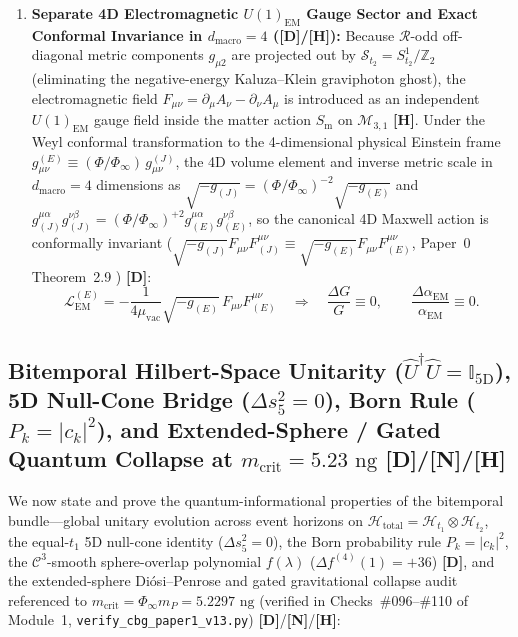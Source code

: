 \documentclass[11pt,a4paper]{article}
\newcommand{\catD}{\textbf{\textcolor{blue!75!black}{[D]}}}
\newcommand{\catH}{\textbf{\textcolor{orange!85!black}{[H]}}}
\newcommand{\catN}{\textbf{\textcolor{teal!75!black}{[N]}}}
\theoremstyle{definition}
\theoremstyle{remark}
\begin{document}
\begin{enumerate}
  \item[\textnormal{(ii)}] \textbf{Separate 4D Electromagnetic $U(1)_{\text{EM}}$ Gauge Sector and Exact Conformal Invariance in $d_{\text{macro}} = 4$ (\catD/\catH):} Because $\mathcal{R}$-odd off-diagonal metric components $g_{\mu 2}$ are projected out by $\mathcal{S}_{t_2} = S^1_{t_2}/\mathbb{Z}_2$ (eliminating the negative-energy Kaluza--Klein graviphoton ghost), the electromagnetic field $F_{\mu\nu} = \partial_{\mu}A_{\nu} - \partial_{\nu}A_{\mu}$ is introduced as an independent $U(1)_{\text{EM}}$ gauge field inside the matter action $S_{\text{m}}$ on $\mathcal{M}_{3,1}$ \catH. Under the Weyl conformal transformation to the 4-dimensional physical Einstein frame $g_{\mu\nu}^{(E)} \equiv (\Phi/\Phi_{\infty})\,g_{\mu\nu}^{(J)}$, the 4D volume element and inverse metric scale in $d_{\text{macro}} = 4$ dimensions as $\sqrt{-g_{(J)}} = (\Phi/\Phi_{\infty})^{-2}\sqrt{-g_{(E)}}$ and $g_{(J)}^{\mu\alpha}g_{(J)}^{\nu\beta} = (\Phi/\Phi_{\infty})^{+2}g_{(E)}^{\mu\alpha}g_{(E)}^{\nu\beta}$, so the canonical 4D Maxwell action is conformally invariant ($\sqrt{-g_{(J)}}F_{\mu\nu}F^{\mu\nu}_{(J)} \equiv \sqrt{-g_{(E)}}F_{\mu\nu}F^{\mu\nu}_{(E)}$, Paper~0 Theorem~2.9 \cite{JV_Paper0}) \catD:
  \begin{equation}
    \mathcal{L}_{\text{EM}}^{(E)} = -\frac{1}{4\mu_{\text{vac}}}\sqrt{-g_{(E)}}\,F_{\mu\nu}F^{\mu\nu}_{(E)} \quad \Longrightarrow \quad \frac{\Delta G}{G} \equiv 0, \qquad \frac{\Delta\alpha_{\text{EM}}}{\alpha_{\text{EM}}} \equiv 0.
    \label{eq:exact_zf_derived}
  \end{equation}
\end{enumerate}

\subsection{\texorpdfstring{Bitemporal Hilbert-Space Unitarity ($\hat{U}^\dagger\hat{U} = \mathbb{I}_{5\text{D}}$), 5D Null-Cone Bridge ($\Delta s_5^2 = 0$), Born Rule ($P_k = |c_k|^2$), and Extended-Sphere / Gated Quantum Collapse at $m_{\text{crit}} = 5.23\text{ ng}$ \catD/\catN/\catH}{Bitemporal Hilbert-Space Unitarity, 5D Null-Cone Bridge, Born Rule, and Extended-Sphere / Gated Quantum Collapse}}

We now state and prove the quantum-informational properties of the bitemporal bundle---global unitary evolution across event horizons on $\mathcal{H}_{\text{total}} = \mathcal{H}_{t_1} \otimes \mathcal{H}_{t_2}$, the equal-$t_1$ 5D null-cone identity ($\Delta s_5^2 = 0$), the Born probability rule $P_k = |c_k|^2$, the $\mathcal{C}^3$-smooth sphere-overlap polynomial $f(\lambda)$ ($\Delta f^{(4)}(1) = +36$) \catD, and the extended-sphere Di\'osi--Penrose and gated gravitational collapse audit referenced to $m_{\text{crit}} = \Phi_{\infty}m_P = 5.2297\text{ ng}$ (verified in Checks~\#096--\#110 of Module~1, \texttt{verify\_cbg\_paper1\_v13.py}) \catD/\catN/\catH:
\end{document}
